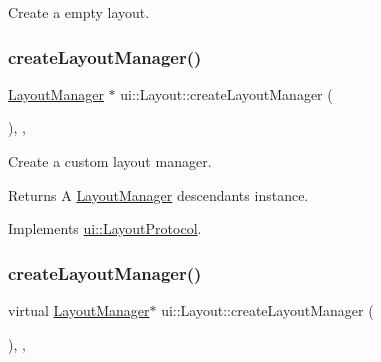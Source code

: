 Create a empty layout. \mbox{\label{classui_1_1Layout_a577a2868212962f2da8522f3fc5b81c7}} 
\subsubsection{\texorpdfstring{create\+Layout\+Manager()}{createLayoutManager()}\hspace{0.1cm}{\footnotesize\ttfamily [1/2]}}
{\footnotesize\ttfamily \hyperlink{classui_1_1LayoutManager}{Layout\+Manager} $\ast$ ui\+::\+Layout\+::create\+Layout\+Manager (\begin{DoxyParamCaption}{ }\end{DoxyParamCaption})\hspace{0.3cm}{\ttfamily [override]}, {\ttfamily [protected]}, {\ttfamily [virtual]}}



Create a custom layout manager. 

\begin{DoxyReturn}{Returns}
A \hyperlink{classui_1_1LayoutManager}{Layout\+Manager} descendants instance. 
\end{DoxyReturn}


Implements \hyperlink{classui_1_1LayoutProtocol_a4ff58063d53e9e9b9684a1e2e6cc485a}{ui\+::\+Layout\+Protocol}.

\mbox{\label{classui_1_1Layout_ade857c1e220dc8b5844966e2c37b7a1f}} 
\subsubsection{\texorpdfstring{create\+Layout\+Manager()}{createLayoutManager()}\hspace{0.1cm}{\footnotesize\ttfamily [2/2]}}
{\footnotesize\ttfamily virtual \hyperlink{classui_1_1LayoutManager}{Layout\+Manager}$\ast$ ui\+::\+Layout\+::create\+Layout\+Manager (\begin{DoxyParamCaption}{ }\end{DoxyParamCaption})\hspace{0.3cm}{\ttfamily [override]}, {\ttfamily [protected]}, {\ttfamily [virtual]}}



